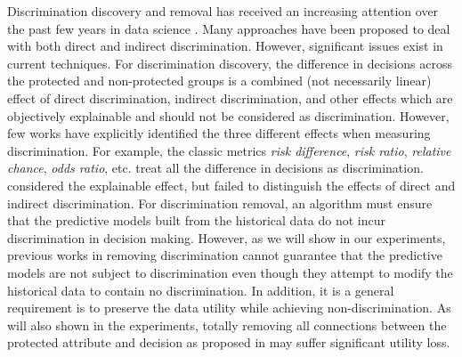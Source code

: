 \documentclass[letterpaper]{article}
\begin{document}
Discrimination discovery and removal has received an increasing attention over the past few years in data science \cite{hajian2013methodology,kamiran2012data,ruggieri2010data,romei2014multidisciplinary,feldman2015certifying}. Many approaches have been proposed to deal with both direct and indirect discrimination. However, significant issues exist in current techniques. For discrimination discovery, the difference in decisions across the protected and non-protected groups is a combined (not necessarily linear) effect of direct discrimination, indirect discrimination, and other effects which are objectively explainable and should not be considered as discrimination. However, few works have explicitly identified the three different effects when measuring discrimination. For example, the classic metrics \emph{risk difference}, \emph{risk ratio}, \emph{relative chance}, \emph{odds ratio}, etc. \cite{romei2014multidisciplinary} treat all the difference in decisions as discrimination. \cite{zliobaite2011handling} considered the explainable effect, but failed to distinguish the effects of direct and indirect discrimination. For discrimination removal, an algorithm must ensure that the predictive models built from the historical data do not incur discrimination in decision making. However, as we will show in our experiments, previous works in removing discrimination cannot guarantee that the predictive models are not subject to discrimination even though they attempt to modify the historical data to contain no discrimination. In addition, it is a general requirement is to preserve the data utility while achieving non-discrimination. As will also shown in the experiments, totally removing all connections between the protected attribute and decision as proposed in \cite{feldman2015certifying} may suffer significant utility loss.

\end{document}
